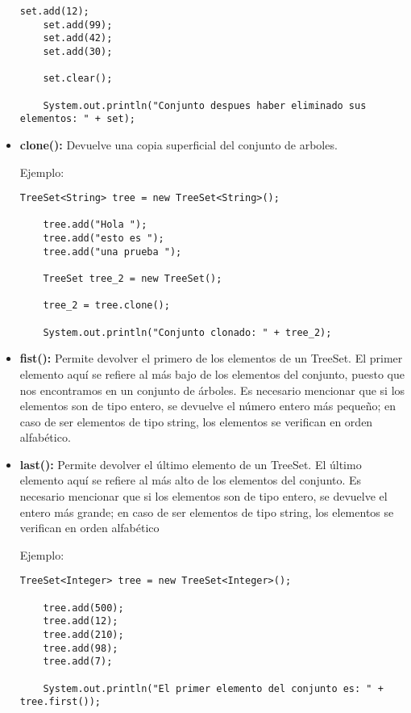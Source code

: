 \documentclass[12pt, letterpaper]{article} %
\begin{document}
\begin{itemize}
\begin{lstlisting}[frame=single]
    set.add(12);
    set.add(99);
    set.add(42);
    set.add(30);

    set.clear();

    System.out.println("Conjunto despues haber eliminado sus elementos: " + set);
    \end{lstlisting}

    \item \textbf{clone():} Devuelve una copia superficial del conjunto de arboles.

    Ejemplo:
    \lstset{language = Java, breaklines=true, basicstyle=\footnotesize}
    \begin{lstlisting}[frame=single]
    TreeSet<String> tree = new TreeSet<String>();

    tree.add("Hola ");
    tree.add("esto es ");
    tree.add("una prueba ");

    TreeSet tree_2 = new TreeSet();

    tree_2 = tree.clone();

    System.out.println("Conjunto clonado: " + tree_2);
    \end{lstlisting}

    \item \textbf{fist():} Permite devolver el primero de los elementos de un TreeSet. El primer elemento aquí se refiere al más bajo de los elementos del conjunto, puesto que nos encontramos en un conjunto de árboles. Es necesario mencionar que si los elementos son de tipo entero, se devuelve el número entero más pequeño; en caso de ser elementos de tipo string, los elementos se verifican en orden alfabético.

    \item \textbf{last():} Permite devolver el último elemento de un TreeSet. El último elemento aquí se refiere al más alto de los elementos del conjunto. Es necesario mencionar que si los elementos son de tipo entero, se devuelve el entero más grande; en caso de ser elementos de tipo string, los elementos se verifican en orden alfabético

    Ejemplo:
    \lstset{language = Java, breaklines=true, basicstyle=\footnotesize}
    \begin{lstlisting}[frame=single]
    TreeSet<Integer> tree = new TreeSet<Integer>();

    tree.add(500);
    tree.add(12);
    tree.add(210);
    tree.add(98);
    tree.add(7);

    System.out.println("El primer elemento del conjunto es: " + tree.first());


\end{lstlisting}
\end{itemize}
\end{document}
